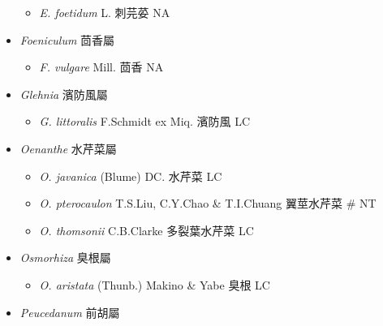 \begin{itemize}
  \begin{itemize}
        \item[] \textit{E. foetidum} L.  刺芫荽   NA
  \end{itemize}
 \item[] \textit{Foeniculum} 茴香屬
                                
  \begin{itemize}
        \item[] \textit{F. vulgare} Mill.  茴香   NA
  \end{itemize}
 \item[] \textit{Glehnia} 濱防風屬
                                
  \begin{itemize}
        \item[] \textit{G. littoralis} F.Schmidt ex Miq.  濱防風   LC
  \end{itemize}
 \item[] \textit{Oenanthe} 水芹菜屬
                                
  \begin{itemize}
        \item[] \textit{O. javanica} (Blume) DC.  水芹菜   LC
        \item[] \textit{O. pterocaulon} T.S.Liu, C.Y.Chao \& T.I.Chuang  翼莖水芹菜  \# NT
        \item[] \textit{O. thomsonii} C.B.Clarke  多裂葉水芹菜   LC
  \end{itemize}
 \item[] \textit{Osmorhiza} 臭根屬
                                
  \begin{itemize}
        \item[] \textit{O. aristata} (Thunb.) Makino \& Yabe  臭根   LC
  \end{itemize}
 \item[] \textit{Peucedanum} 前胡屬
                                

\end{itemize}
